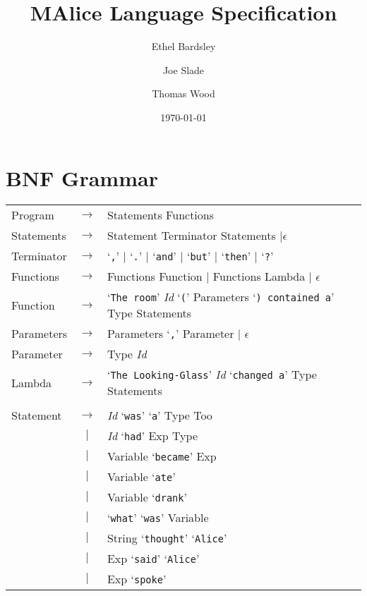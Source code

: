 \documentclass[a4paper,11pt]{article}
\begin{document}
\title{MAlice Language Specification}

\author{Ethel Bardsley \and Joe Slade \and Thomas Wood}

\date{\today}         %

\maketitle            %

\section{BNF Grammar} 
\begin{tabular}{lcl}
Program     & $\to$ & Statements Functions \\
Statements  & $\to$ & Statement Terminator Statements $| \epsilon$ \\
Terminator  & $\to$ & `\verb:,:' $|$ `\verb:.:' $|$ `\verb:and:' $|$ `\verb:but:' $|$ `\verb:then:' $|$ `\verb|?|'\\
Functions   & $\to$ & Functions Function $|$ Functions Lambda $|$ $\epsilon$ \\
Function    & $\to$ & `\verb|The room|' \emph{Id} `\verb|(|' Parameters `\verb|) contained a|' Type Statements \\
Parameters  & $\to$ & Parameters `\verb|,|' Parameter $|$ $\epsilon$ \\
Parameter   & $\to$ & Type \emph{Id} \\
Lambda      & $\to$ & `\verb|The Looking-Glass|' \emph{Id} `\verb|changed a|' Type Statements \\
\\
Statement   & $\to$ & \emph{Id} `\verb|was|' `\verb|a|' Type Too \\
            &  $|$  & \emph{Id} `\verb|had|' Exp Type \\
            &  $|$  & Variable `\verb|became|' Exp \\
            &  $|$  & Variable `\verb|ate|' \\
            &  $|$  & Variable `\verb|drank|' \\
            &  $|$  & `\verb|what|' `\verb|was|' Variable \\
            &  $|$  & String `\verb|thought|' `\verb|Alice|' \\
            &  $|$  & Exp `\verb|said|' `\verb|Alice|' \\
            &  $|$  & Exp `\verb|spoke|' \\

\end{tabular}
\end{document}
